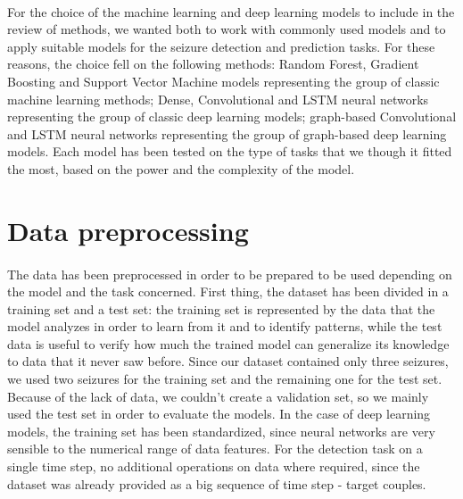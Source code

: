 \paragraph{} For the choice of the machine learning and deep learning models to include in the review of methods, we wanted both to work with commonly used models and to apply suitable models for the seizure detection and prediction tasks. For these reasons, the choice fell on the following methods: Random Forest, Gradient Boosting and Support Vector Machine models representing the group of classic machine learning methods; Dense, Convolutional and LSTM neural networks representing the group of classic deep learning models; graph-based Convolutional and LSTM neural networks representing the group of graph-based deep learning models. Each model has been tested on the type of tasks that we though it fitted the most, based on the power and the complexity of the model.


\section{Data preprocessing} \label{sec: step_data_preprocessing}
\paragraph{} The data has been preprocessed in order to be prepared to be used depending on the model and the task concerned. First thing, the dataset has been divided in a training set and a test set: the training set is represented by the data that the model analyzes in order to learn from it and to identify patterns, while the test data is useful to verify how much the trained model can generalize its knowledge to data that it never saw before. Since our dataset contained only three seizures, we used two seizures for the training set and the remaining one for the test set. Because of the lack of data, we couldn't create a validation set, so we mainly used the test set in order to evaluate the models. In the case of deep learning models, the training set has been standardized, since neural networks are very sensible to the numerical range of data features.
For the detection task on a single time step, no additional operations on data where required, since the dataset was already provided as a big sequence of time step - target couples.

